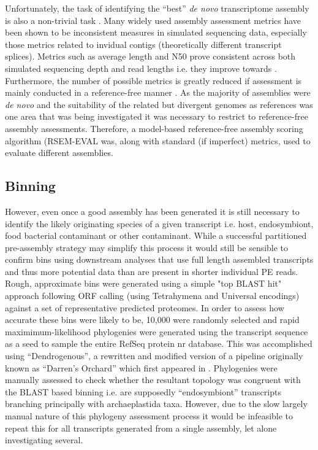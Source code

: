 Unfortunately, the task of identifying the ``best'' \textit{de novo} transcriptome assembly is also a non-trivial 
task \citep{Neil2013}.  Many widely used assembly assessment metrics have been shown to be
inconsistent measures in simulated sequencing data, especially those metrics related to invidual
contigs (theoretically different transcript splices).  Metrics such as average length and N50
prove consistent across both simulated sequencing depth and read lengths i.e. they improve 
towards \citep{Neil2013}.  Furthermore, the number of possible metrics is greatly reduced
if assessment is mainly conducted in a reference-free manner \citep{Li2014}.  As the majority of
assemblies were \textit{de novo} and the suitability of the related but divergent genomes
as references was one area that was being investigated it was necessary to restrict to reference-free
assembly assessments.  Therefore, a model-based reference-free assembly scoring algorithm (RSEM-EVAL \citep{Li2014} was,
    along with standard (if imperfect) metrics, used to evaluate different assemblies. 


\subsection{Binning}

However, even once a good assembly has been generated it is still necessary to identify the likely
originating species of a given transcript i.e. host, endosymbiont, food bacterial contaminant or other
contaminant.  While a successful partitioned pre-assembly strategy may simplify this process it would still
be sensible to confirm bins using downstream analyses that use full length assembled transcripts and thus
more potential data than are present in shorter individual PE reads.  Rough, approximate bins were
generated using a simple "top BLAST hit" approach following ORF calling (using Tetrahymena and Universal
encodings) against a set of representative predicted proteomes.  In order to assess how accurate these
bins were likely to be, 10,000 were randomly selected and rapid maximimum-likelihood phylogenies were
generated using the transcript sequence as a seed to sample the entire RefSeq protein nr database.
This was accomplished using ``Dendrogenous'', a rewritten and modified version of a pipeline originally known 
as ``Darren's Orchard'' which first appeared in \citep{Richards2009g}.  Phylogenies were manually assessed to check
whether the resultant topology was congruent with the BLAST based binning i.e. are supposedly ``endosymbiont''
transcripts branching principally with archaeplastida taxa.  
However, due to the slow largely manual nature of this phylogeny assessment process it would be infeasible
to repeat this for all transcripts generated from a single assembly, let alone investigating several. 



